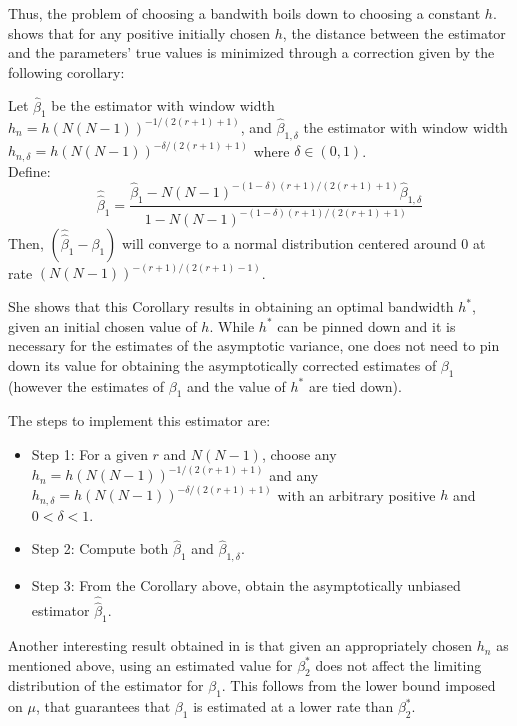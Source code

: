 Thus, the problem of choosing a bandwith boils down to choosing a constant $h$. \cite{kyriazidou1997estimation} shows that for any positive initially chosen $h$, the distance between the estimator and the parameters' true values is minimized through a correction given by the following corollary:

\begin{corollary} \label{corollary}
    Let $\hat{\beta}_1$ be the estimator with window width $h_n = h  (N(N-1))^{-1/(2 (r+1) +1)}$, and $\hat{\beta}_{1,\delta}$ the estimator with window width $h_{n,\delta} = h  (N(N-1))^{-\delta/(2 (r+1) +1)}$ where $\delta \in (0,1)$. \\
    Define:
     $$\hat{\hat{\beta}}_1 = \frac{\hat{\beta}_1 - N(N-1)^{-(1-\delta)(r+1)/(2(r+1)+1)} \hat{\beta}_{1,\delta}}{1 - N(N-1)^{-(1-\delta)(r+1)/(2(r+1)+1)}}$$
     Then, $(\hat{\hat{\beta}}_1 - \beta_1)$ will converge to a normal distribution centered around 0 at rate $(N(N-1))^{-(r+1)/(2(r+1)-1)}$.
\end{corollary}

She shows that this Corollary results in obtaining an optimal bandwidth $h^*$, given an initial chosen value of $h$. While $h^*$ can be pinned down and it is necessary for the estimates of the asymptotic variance, one does not need to pin down its value for obtaining the asymptotically corrected estimates of $\beta_1$ (however the estimates of $\beta_1$ and the value of $h^*$ are tied down).

The steps to implement this estimator are:
\begin{itemize}
    \item Step 1: For a given $r$ and $N(N-1)$, choose any $h_n = h  (N(N-1))^{-1/(2 (r+1) +1)}$ and any $h_{n,\delta} = h  (N(N-1))^{-\delta/(2 (r+1) +1)}$ with an arbitrary positive $h$ and $0<\delta<1$.
    \item Step 2: Compute both $\hat{\beta}_1$ and $\hat{\beta}_{1,\delta}$.
    \item Step 3: From the Corollary above, obtain the asymptotically unbiased estimator $\hat{\hat{\beta}}_1$.
\end{itemize}

Another interesting result obtained in \cite{kyriazidou1997estimation} is that given an appropriately chosen $h_n$ as mentioned above, using an estimated value for $\beta_2^*$ does not affect the limiting distribution of the estimator for $\beta_1$. This follows from the lower bound imposed on $\mu$, that guarantees that $\beta_1$ is estimated at a lower rate than $\beta_2^*$.


